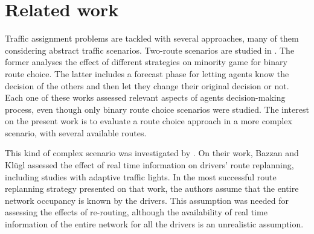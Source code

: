 \documentclass{RITA}
\begin{document}
\section{Related work}
\label{sec:related}




Traffic assignment problems are tackled with several approaches, many of them considering abstract traffic scenarios. Two-route scenarios are studied in \cite{Bazzan+2000icmas,Kluegl&Bazzan2004}. The former analyses the effect of different strategies on minority game for binary route choice. The latter includes a forecast phase for letting agents know the decision of the others and then let they change their original decision or not. Each one of these works assessed relevant aspects of agents decision-making process, even though only binary route choice scenarios were studied. The interest on the present work is to evaluate a route choice approach in a more complex scenario, with several available routes.

This kind of complex scenario was investigated by \cite{Bazzan&Kluegl2008}. On their work, Bazzan and Kl\"ugl assessed the effect of real time information on drivers' route replanning, including studies with adaptive traffic lights. In the most successful route replanning strategy presented on that work, the authors assume that the entire network occupancy is known by the drivers. This assumption was needed for assessing the effects of re-routing, although the availability of real time information of the entire network for all the drivers is an unrealistic assumption.
\end{document}
